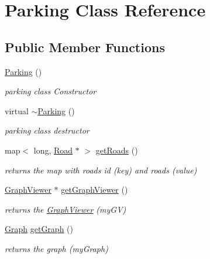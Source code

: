 \hypertarget{class_parking}{}\section{Parking Class Reference}
\label{class_parking}
\subsection*{Public Member Functions}
\begin{DoxyCompactItemize}
\item 
\hypertarget{class_parking_ac086edc07a4a5930e29f61f8b97a8875}{}\label{class_parking_ac086edc07a4a5930e29f61f8b97a8875} 
\hyperlink{class_parking_ac086edc07a4a5930e29f61f8b97a8875}{Parking} ()
\begin{DoxyCompactList}\small\item\em parking class Constructor \end{DoxyCompactList}\item 
\hypertarget{class_parking_aba04e48c6e34ae0c1eaee8f3d670e8fb}{}\label{class_parking_aba04e48c6e34ae0c1eaee8f3d670e8fb} 
virtual \hyperlink{class_parking_aba04e48c6e34ae0c1eaee8f3d670e8fb}{$\sim$\+Parking} ()
\begin{DoxyCompactList}\small\item\em parking class destructor \end{DoxyCompactList}\item 
map$<$ long, \hyperlink{class_road}{Road} $\ast$ $>$ \hyperlink{class_parking_a9417cfc4ef7b657a9f8669ac99ba52dc}{get\+Roads} ()
\begin{DoxyCompactList}\small\item\em returns the map with roads id (key) and roads (value) \end{DoxyCompactList}\item 
\hyperlink{class_graph_viewer}{Graph\+Viewer} $\ast$ \hyperlink{class_parking_aa4e46408596998c56555a55010efa8c5}{get\+Graph\+Viewer} ()
\begin{DoxyCompactList}\small\item\em returns the \hyperlink{class_graph_viewer}{Graph\+Viewer} (my\+GV) \end{DoxyCompactList}\item 
\hyperlink{class_graph}{Graph} \hyperlink{class_parking_ae41ff10e4c3b9e8bff5c3fb4565bb270}{get\+Graph} ()
\begin{DoxyCompactList}\small\item\em returns the graph (my\+Graph) \end{DoxyCompactList}\item 

\end{DoxyCompactItemize}
